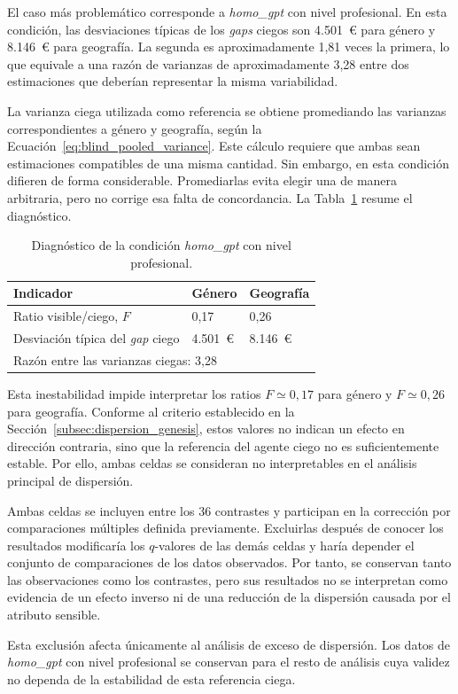 El caso más problemático corresponde a \textit{homo\_gpt} con nivel profesional. En esta condición, las desviaciones típicas de los \textit{gaps} ciegos son 4.501~€ para género y 8.146~€ para geografía. La segunda es aproximadamente 1,81 veces la primera, lo que equivale a una razón de varianzas de aproximadamente 3,28 entre dos estimaciones que deberían representar la misma variabilidad.

La varianza ciega utilizada como referencia se obtiene promediando las varianzas correspondientes a género y geografía, según la Ecuación~\ref{eq:blind_pooled_variance}. Este cálculo requiere que ambas sean estimaciones compatibles de una misma cantidad. Sin embargo, en esta condición difieren de forma considerable. Promediarlas evita elegir una de manera arbitraria, pero no corrige esa falta de concordancia. La Tabla~\ref{tab:celda_no_interpretable} resume el diagnóstico.

\begin{table}[htbp]
	\centering
	\caption{Diagnóstico de la condición \textit{homo\_gpt} con nivel profesional.}
	\label{tab:celda_no_interpretable}
	\small
	\begin{tabular}{p{5.4cm} p{3.4cm} p{3.4cm}}
		\hline
		\textbf{Indicador} & \textbf{Género} & \textbf{Geografía} \\
		\hline
		
		Ratio visible/ciego, $F$
		& 0,17 & 0,26 \\
		
		Desviación típica del \textit{gap} ciego
		& 4.501~€ & 8.146~€ \\
		
		\hline
		\multicolumn{3}{l}{
			Razón entre las varianzas ciegas: 3,28
		} \\
		\hline
	\end{tabular}
\end{table}

Esta inestabilidad impide interpretar los ratios $F\simeq0{,}17$ para género y $F\simeq0{,}26$ para geografía. Conforme al criterio establecido en la Sección~\ref{subsec:dispersion_genesis}, estos valores no indican un efecto en dirección contraria, sino que la referencia del agente ciego no es suficientemente estable. Por ello, ambas celdas se consideran no interpretables en el análisis principal de dispersión.

Ambas celdas se incluyen entre los 36 contrastes y participan en la corrección por comparaciones múltiples definida previamente. Excluirlas después de conocer los resultados modificaría los $q$-valores de las demás celdas y haría depender el conjunto de comparaciones de los datos observados. Por tanto, se conservan tanto las observaciones como los contrastes, pero sus resultados no se interpretan como evidencia de un efecto inverso ni de una reducción de la dispersión causada por el atributo sensible.

Esta exclusión afecta únicamente al análisis de exceso de dispersión. Los datos de \textit{homo\_gpt} con nivel profesional se conservan para el resto de análisis cuya validez no dependa de la estabilidad de esta referencia ciega.